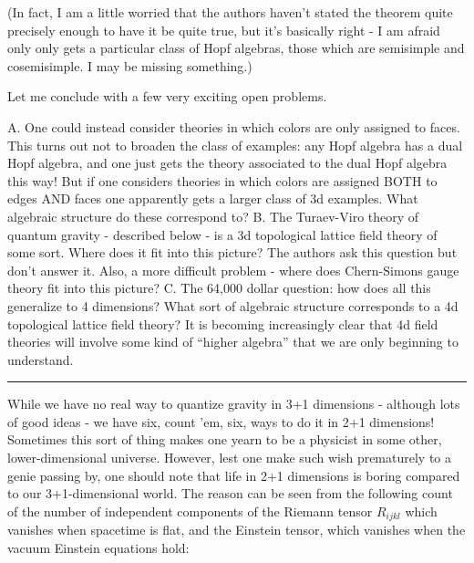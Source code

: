 \documentclass{article}
\def\tightlist{}
\renewcommand{\texttt}[1]{%
  \begingroup
  \ttfamily
  \begingroup\lccode`~=`/\lowercase{\endgroup\def~}{/\discretionary{}{}{}}%
  \begingroup\lccode`~=`[\lowercase{\endgroup\def~}{[\discretionary{}{}{}}%
  \begingroup\lccode`~=`.\lowercase{\endgroup\def~}{.\discretionary{}{}{}}%
  \catcode`/=\active\catcode`[=\active\catcode`.=\active
  \scantokens{#1\noexpand}%
  \endgroup
}
\begin{document}
(In fact, I am a little worried that the authors haven't stated the
theorem quite precisely enough to have it be quite true, but it's
basically right - I am afraid only only gets a particular class of Hopf
algebras, those which are semisimple and cosemisimple. I may be missing
something.)

Let me conclude with a few very exciting open problems.

A. One could instead consider theories in which colors are only assigned
to faces. This turns out not to broaden the class of examples: any Hopf
algebra has a dual Hopf algebra, and one just gets the theory associated
to the dual Hopf algebra this way! But if one considers theories in
which colors are assigned BOTH to edges AND faces one apparently gets a
larger class of 3d examples. What algebraic structure do these
correspond to? B. The Turaev-Viro theory of quantum gravity - described
below - is a 3d topological lattice field theory of some sort. Where
does it fit into this picture? The authors ask this question but don't
answer it. Also, a more difficult problem - where does Chern-Simons
gauge theory fit into this picture? C. The 64,000 dollar question: how
does all this generalize to 4 dimensions? What sort of algebraic
structure corresponds to a 4d topological lattice field theory? It is
becoming increasingly clear that 4d field theories will involve some
kind of ``higher algebra'' that we are only beginning to understand.

\begin{center}\rule{0.5\linewidth}{0.5pt}\end{center}


While we have no real way to quantize gravity in 3+1 dimensions -
although lots of good ideas - we have six, count 'em, six, ways to do it
in 2+1 dimensions! Sometimes this sort of thing makes one yearn to be a
physicist in some other, lower-dimensional universe. However, lest one
make such wish prematurely to a genie passing by, one should note that
life in 2+1 dimensions is boring compared to our 3+1-dimensional world.
The reason can be seen from the following count of the number of
independent components of the Riemann tensor \(R_{ijkl}\) which vanishes
when spacetime is flat, and the Einstein tensor, which vanishes when the
vacuum Einstein equations hold:
\end{document}
